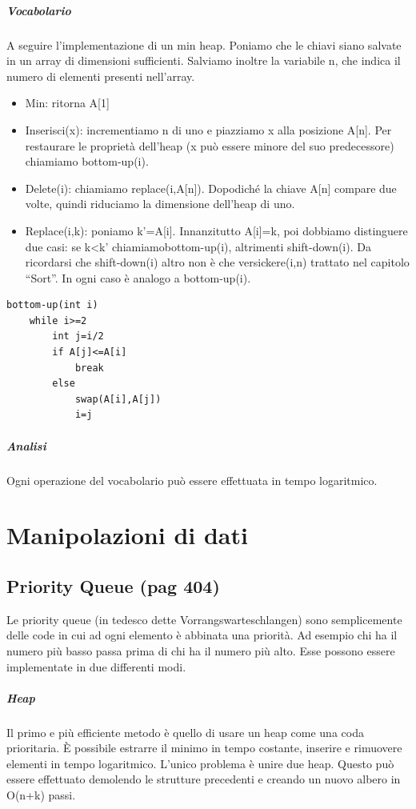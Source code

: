 \documentclass[a4paper]{book}
\begin{document}
\paragraph*{Vocabolario}
A seguire l'implementazione di un min heap. Poniamo che le chiavi siano salvate in un array di dimensioni sufficienti. Salviamo inoltre la variabile n, che indica il numero di elementi presenti nell'array.
\begin{itemize}
\item Min: ritorna A[1]
\item Inserisci(x): incrementiamo n di uno e piazziamo x alla posizione A[n]. Per restaurare le proprietà dell'heap (x può essere minore del suo predecessore) chiamiamo bottom-up(i).
\item Delete(i): chiamiamo replace(i,A[n]). Dopodiché la chiave A[n] compare due volte, quindi riduciamo la dimensione dell'heap di uno. 
\item Replace(i,k): poniamo k'=A[i]. Innanzitutto A[i]=k, poi dobbiamo distinguere due casi: se k<k' chiamiamobottom-up(i), altrimenti shift-down(i). Da ricordarsi che shift-down(i) altro non è che versickere(i,n) trattato nel capitolo ``Sort''. In ogni caso è analogo a bottom-up(i).
\end{itemize}
\begin{lstlisting}
bottom-up(int i)
	while i>=2
		int j=i/2
		if A[j]<=A[i]
			break
		else
			swap(A[i],A[j])
			i=j	
\end{lstlisting}
\paragraph*{Analisi}
Ogni operazione del vocabolario può essere effettuata in tempo logaritmico.
\chapter{Manipolazioni di dati}
\section{Priority Queue (pag 404)}
Le priority queue (in tedesco dette Vorrangswarteschlangen) sono semplicemente delle code in cui ad ogni elemento è abbinata una priorità. Ad esempio chi ha il numero più basso passa prima di chi ha il numero più alto. Esse possono essere implementate in due differenti modi.
\paragraph*{Heap}
Il primo e più efficiente metodo è quello di usare un heap come una coda prioritaria. È possibile estrarre il minimo in tempo costante, inserire e rimuovere elementi in tempo logaritmico. L'unico problema è unire due heap. Questo può essere effettuato demolendo le strutture precedenti e creando un nuovo albero in O(n+k) passi.
\end{document}
